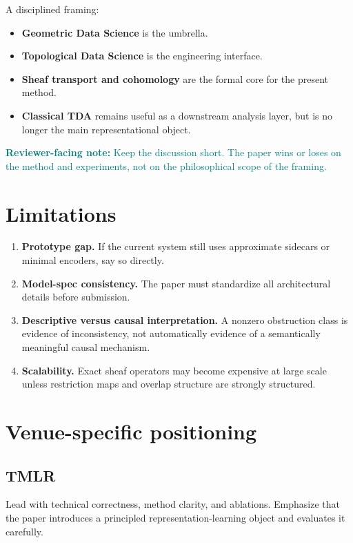 \documentclass[11pt]{article}
\newcommand{\reviewer}[1]{\textcolor{teal}{\textbf{Reviewer-facing note:} #1}}
\begin{document}
A disciplined framing:
\begin{itemize}[leftmargin=1.5em]
    \item \textbf{Geometric Data Science} is the umbrella.
    \item \textbf{Topological Data Science} is the engineering interface.
    \item \textbf{Sheaf transport and cohomology} are the formal core for the present method.
    \item \textbf{Classical TDA} remains useful as a downstream analysis layer, but is no longer the main representational object.
\end{itemize}

\reviewer{Keep the discussion short. The paper wins or loses on the method and experiments, not on the philosophical scope of the framing.}

\section{Limitations}

\begin{enumerate}[leftmargin=1.5em]
    \item \textbf{Prototype gap.} If the current system still uses approximate sidecars or minimal encoders, say so directly.
    \item \textbf{Model-spec consistency.} The paper must standardize all architectural details before submission.
    \item \textbf{Descriptive versus causal interpretation.} A nonzero obstruction class is evidence of inconsistency, not automatically evidence of a semantically meaningful causal mechanism.
    \item \textbf{Scalability.} Exact sheaf operators may become expensive at large scale unless restriction maps and overlap structure are strongly structured.
\end{enumerate}

\section{Venue-specific positioning}

\subsection{TMLR}
Lead with technical correctness, method clarity, and ablations. Emphasize that the paper introduces a principled representation-learning object and evaluates it carefully.
\end{document}

